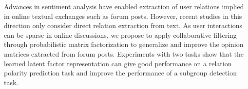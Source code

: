 Advances in sentiment analysis have enabled extraction of user relations implied in online textual exchanges such as forum posts. However, recent
 studies in this direction only consider direct relation extraction from text.
 As user interactions can be sparse in online discussions, we propose to apply
 collaborative filtering through probabilistic matrix factorization to
 generalize and improve the opinion matrices extracted from forum posts.
 Experiments with two tasks show that the learned latent factor representation
 can give good performance on a relation polarity prediction task and improve
 the performance of a subgroup detection task.


